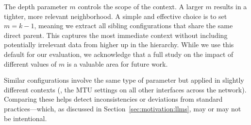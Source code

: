 The depth parameter $m$ controls the scope of the context. A larger $m$ results in a tighter, more relevant neighborhood.
A simple and effective choice is to set $m = k-1$, meaning we extract all sibling configurations that share the same direct parent. This captures the most immediate context without including potentially irrelevant data from higher up in the hierarchy. While we use this default for our evaluation, we acknowledge that a full study on the impact of different values of $m$ is a valuable area for future work.

Similar configurations involve the same type of parameter but applied in slightly different contexts (\eg, the MTU settings on all other interfaces across the network). Comparing these helps detect inconsistencies or deviations from standard practices---which, as discussed in Section~\ref{sec:motivation:llms}, may or may not be intentional.





